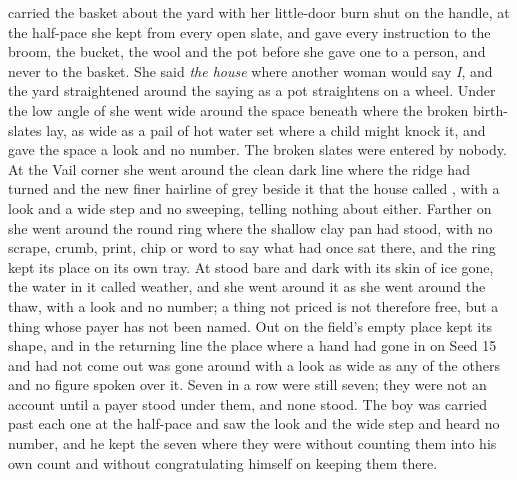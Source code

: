  carried the basket about the yard with her little-door burn shut on the handle, at the half-pace she kept from every open slate, and gave every instruction to the broom, the bucket, the wool and the pot before she gave one to a person, and never to the basket. She said \emph{the house} where another woman would say \emph{I}, and the yard straightened around the saying as a pot straightens on a wheel. Under the low angle of  she went wide around the space beneath  where the broken birth-slates lay, as wide as a pail of hot water set where a child might knock it, and gave the space a look and no number. The broken slates were entered by nobody. At the Vail corner she went around the clean dark line where the  ridge had turned and the new finer hairline of grey beside it that the house called , with a look and a wide step and no sweeping, telling nothing about either. Farther on she went around the round ring where the shallow clay pan had stood, with no scrape, crumb, print, chip or word to say what had once sat there, and the ring kept its place on its own tray. At   stood bare and dark with its skin of ice gone, the water in it called weather, and she went around it as she went around the thaw, with a look and no number; a thing not priced is not therefore free, but a thing whose payer has not been named. Out on  the field's empty place kept its shape, and in the returning line the place where a hand had gone in on Seed 15 and had not come out was gone around with a look as wide as any of the others and no figure spoken over it. Seven in a row were still seven; they were not an account until a payer stood under them, and none stood. The boy was carried past each one at the half-pace and saw the look and the wide step and heard no number, and he kept the seven where they were without counting them into his own count and without congratulating himself on keeping them there.

